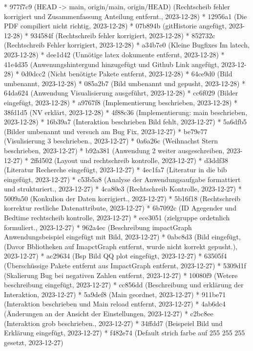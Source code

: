 \documentclass[usegeometry=true]{scrartcl}
\begin{document}
* 977f7c9 (HEAD -> main, origin/main, origin/HEAD) (Rechtscheib fehler korrigiert und Zusammenfassung Anteilung entfernt., 2023-12-28)
* 12956a1 (Die PDF compiliert nicht richtig, 2023-12-28)
* 07b894b (gitHistorie angefügt, 2023-12-28)
* 934584f (Rechtschreib fehler korrigiert, 2023-12-28)
* 852732c (Rechtschreib Fehler korrigiert, 2023-12-28)
* a34b7e0 (Kleine Bugfixes Im latech, 2023-12-28)
* dee1d42 (Unnötige latex dokumente entfernt, 2023-12-28)
* 41e4d35 (Anwenungshintergund hinzugefügt und Github Link angefügt, 2023-12-28)
* 0d0dcc2 (Nicht benötigte Pakete entfernt, 2023-12-28)
* 64ce9d0 (Bild umbenannt, 2023-12-28)
* 085a2b7 (Bild umbenannt und gepusht, 2023-12-28)
* 64da624 (Anwendung Visualisierung ausgeführt, 2023-12-28)
* cc6f029 (Bilder eingefügt, 2023-12-28)
* a9767f8 (Implementierung beschrieben, 2023-12-28)
* 38fd1d5 (NV erklärt, 2023-12-28)
* 4f88c36 (Implementierung: main beschrieben, 2023-12-28)
* 16b39a7 (Interaktion beschrieben Bild fehlt, 2023-12-27)
* 5a6dfb5 (Bilder umbenannt und versuch am Bug Fix, 2023-12-27)
* be79e77 (Visulisierung 3 beschrieben., 2023-12-27)
* 0a6a26c (Weihnachst Stern beschrieben, 2023-12-27)
* b92a381 (Anwendung 2 weiter ausgeschreiben, 2023-12-27)
* 2ffd502 (Layout und rechtschreib kontrolle, 2023-12-27)
* d3ddf38 (Literatur Recherche eingefügt, 2023-12-27)
* 4ec1fa7 (Literatur in die bib eingefügt, 2023-12-27)
* c53b5a8 (Analyse der Anwendungsaufgabe formattiert und strukturiert., 2023-12-27)
* 4ca80e3 (Rechtschreib Kontrolle, 2023-12-27)
* 5009a50 (Konkulion der Daten korrigiert., 2023-12-27)
* 5b16f18 (Rechtschreib korrektur restliche Datenattribute, 2023-12-27)
* 6b7092c (ID Agegender und Bedtime rechtscheib kontrolle, 2023-12-27)
* ece3051 (zielgruppe ordetnlich formuliert., 2023-12-27)
* 962a4ec (Beschreibung impactGraph Anwendungsbeispiel eingefügt mit Bild, 2023-12-27)
* 0abc8d3 (Bild eingefügt, (Davor Bbliotheken auf ImapctGraph entfernt, wurde nicht korrekt gepusht.), 2023-12-27)
* ac29634 (Bsp Bild QQ plot eingefügt, 2023-12-27)
* 63505f4 (Überschüssige Pakete entfernt aus ImpactGraph entfernt, 2023-12-27)
* 5309d1f (Skalierung Bug bei negativen Zahlen entfernt, 2023-12-27)
* 10080f9 (Wetere beschreibung eingefügt, 2023-12-27)
* cc856dd (Beschreibung und erklärung der Interaktion, 2023-12-27)
* 5a9def8 (Main geordnet, 2023-12-27)
* 911be71 (Interaktion beschrieben und Main reload entfernt, 2023-12-27)
* 4ab6dc4 (Änderungen an der Ansicht der Einstellungen, 2023-12-27)
* c2bc8ee (Interaktion grob beschrieben., 2023-12-27)
* 34ffdd7 (Beispeiel Bild und Erklärung eingefügt, 2023-12-27)
* f482e74 (Default strich farbe auf 255 255 255 gesetzt, 2023-12-27)
\end{document}
